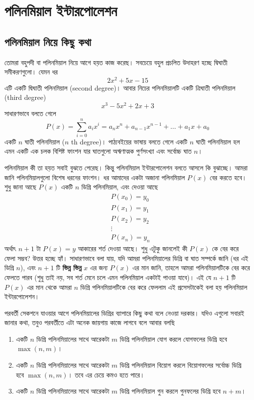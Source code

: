 \chapter{পলিনমিয়াল ইন্টারপোলেশন}

\section{পলিনমিয়াল নিয়ে কিছু কথা}
তোমরা বহুপদী বা পলিনমিয়াল নিয়ে আগে হয়ত কাজ করেছ। সবচেয়ে বহুল প্রচলিত উদাহরণ হচ্ছে দ্বিঘাতী সমীকরণগুলো। যেমন ধর 
$$2x^2 + 5x - 15$$
এটি একটি দ্বিঘাতী পলিনমিয়াল (second degree)। আবার নিচের পলিনমিয়ালটি একটি ত্রিঘাতী পলিনমিয়াল (third degree) 
$$x^3 - 5x^2 + 2x + 3$$
সাধারণভাবে বলতে গেলে 
$$P(x) = \sum_{i=0}^n a_{i} x^{i} = a_n x^n + a_{n - 1} x^{n - 1} + \dots + a_1 x + a_{0}$$ 
একটি $n$ ঘাতী পলিনমিয়াল ($n$ th degree)। পাঠ্যবইয়ের ভাষায় বলতে গেলে একটি $n$ ঘাতী পলিনমিয়াল হল এমন একটি এক চলক বিশিষ্ট ফাংশন যার ঘাতগুলো অঋণাত্মক পুর্ণসংখ্যা এবং সর্বোচ্চ ঘাত $n$।

পলিনমিয়াল কী তা হয়ত সবাই বুঝতে পেরেছ। কিন্তু পলিনমিয়াল ইন্টারপোলেশন বলতে আসলে কি বুঝাচ্ছে। আমরা জানি পলিনমিয়ালগুলো বিশেষ ধরনের ফাংশন। ধর আমাদের একটা অজানা পলিনমিয়াল $P(x)$ বের করতে হবে। শুধু জানা আছে  $P(x)$ একটি $n$ ডিগ্রি পলিনমিয়াল, এবং  দেওয়া আছে 
\begin{align*}
&P(x_0) = y_0 \\
&P(x_1) = y_1 \\
&P(x_2) = y_2 \\
&\vdots \\
&P(x_n) = y_n
\end{align*}
অর্থাৎ $n + 1$ টা $P(x) = y$ আকারের শর্ত দেওয়া আছে। শুধু এটুকু জানলেই কী $P(x)$ কে বের করে ফেলা সম্ভব? উত্তর হচ্ছে হ্যাঁ। সাধারণভাবে বলা যায়, যদি আমরা পলিনমিয়ালের ডিগ্রি বা ঘাত সম্পর্কে জানি (ধর এই ডিগ্রি $n$), এবং $n + 1$ টি \textbf{ভিন্ন ভিন্ন} $x$ এর জন্য $P(x)$ এর মান জানি, তাহলে আমরা পলিনমিয়ালটিকে বের করে ফেলতে পারব (শুধু তাই নয়, সব শর্ত মেনে চলে এমন পলিনমিয়াল একটাই পাওয়া যাবে)। এই যে $n + 1$ টি $P(x)$ এর মান থেকে আমরা $n$ ডিগ্রি পলিনমিয়ালটিকে বের করে ফেললাম এই প্রসেসটাকেই বলা হয় পলিনমিয়াল ইন্টারপোলেশন। 

পরবর্তী সেকশনে যাওয়ার আগে পলিনমিয়ালের ডিগ্রির ব্যাপারে কিছু কথা বলে নেওয়া দরকার। যদিও এগুলো সবারই জানার কথা, তবুও পরবর্তীতে এটা অনেক জায়গায় কাজে লাগবে বলে আবার বলছি 
\begin{enumerate}
\item একটি $n$ ডিগ্রি পলিনমিয়ালের সাথে আরেকটা $m$ ডিগ্রি পলিনমিয়াল যোগ করলে যোগফলের ডিগ্রি হবে $\max{(n, m)}$। 
\item একটি $n$ ডিগ্রি পলিনমিয়ালের সাথে আরেকটা $m$ ডিগ্রি পলিনমিয়াল বিয়োগ করলে বিয়োগফলের সর্বোচ্চ ডিগ্রি হবে $\max{(n, m)}$। তবে এর চেয়ে কমও হতে পারে।
\item একটি $n$ ডিগ্রি পলিনমিয়ালের সাথে আরেকটা $m$ ডিগ্রি পলিনমিয়াল গুন করলে গুনফলের ডিগ্রি হবে $n + m$।
\end{enumerate}

